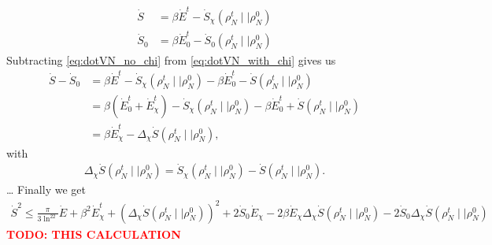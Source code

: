 \documentclass{book}
\numberwithin{equation}{section} %
\begin{document}
\begin{align}
    \dot{S} &= \beta \dot{E}^t - \dot{S}_\chi(\rho^t_N \mid \mid \rho^0_N)\label{eq:dotVN_with_chi}\\
    \dot{S}_0 &= \beta \dot{E}_0^t- \dot{S}_0(\rho^t_N \mid \mid \rho^0_N)\label{eq:dotVN_no_chi}
\end{align}
Subtracting \cref{eq:dotVN_no_chi} from \cref{eq:dotVN_with_chi} gives us
\begin{align}
    \dot{S} - \dot{S}_0 &= \beta \dot{E}^t - \dot{S}_\chi(\rho^t_N \mid \mid \rho^0_N) - \beta \dot{E}_0^t - \dot{S}(\rho^t_N \mid \mid \rho^0_N)\nonumber\\
    &= \beta \left(\dot{E}_0^t + \dot{E}_\chi^t\right) - \dot{S}_\chi(\rho^t_N \mid \mid \rho^0_N) - \beta \dot{E}_0^t + \dot{S}(\rho^t_N \mid \mid \rho^0_N)\nonumber\\
    &= \beta \dot{E}_\chi^t - \Delta_\chi \dot{S}(\rho^t_N \mid \mid \rho^0_N),
\end{align}
with
\begin{align*}
    \Delta_\chi\dot{S}(\rho^t_N \mid \mid \rho^0_N) = \dot{S}_\chi(\rho^t_N \mid \mid \rho^0_N) - \dot{S}(\rho^t_N \mid \mid \rho^0_N).
\end{align*}
\dots
Finally we get
\begin{align}\label{eq:newbound}
    \dot{S}^2 \leq \frac{\pi}{3\ln^22} \dot{E} + \beta^2 \dot{E}^t_\chi + \left(\Delta_\chi\dot{S}(\rho^t_N \mid \mid \rho^0_N)\right)^2 + 2\dot{S}_0 \dot{E}_\chi
    - 2\beta\dot{E}_\chi \Delta_\chi\dot{S}(\rho^t_N \mid \mid \rho^0_N) -2\dot{S}_0 \Delta_\chi\dot{S}(\rho^t_N \mid \mid \rho^0_N)
\end{align}
\textcolor{red}{\textbf{TODO: THIS CALCULATION}}
\end{document}
